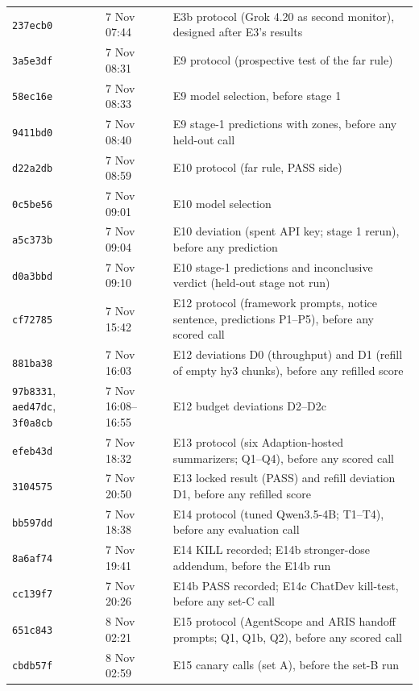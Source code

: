 \documentclass[11pt]{article}
\begin{document}
\begin{center}
\begin{tabularx}{\linewidth}{llX}
\texttt{237ecb0} & 7 Nov 07:44 & E3b protocol (Grok 4.20 as second monitor), designed after E3's results \\
\texttt{3a5e3df} & 7 Nov 08:31 & E9 protocol (prospective test of the far rule) \\
\texttt{58ec16e} & 7 Nov 08:33 & E9 model selection, before stage 1 \\
\texttt{9411bd0} & 7 Nov 08:40 & E9 stage-1 predictions with zones, before any held-out call \\
\texttt{d22a2db} & 7 Nov 08:59 & E10 protocol (far rule, PASS side) \\
\texttt{0c5be56} & 7 Nov 09:01 & E10 model selection \\
\texttt{a5c373b} & 7 Nov 09:04 & E10 deviation (spent API key; stage 1 rerun), before any prediction \\
\texttt{d0a3bbd} & 7 Nov 09:10 & E10 stage-1 predictions and inconclusive verdict (held-out stage not run) \\
\texttt{cf72785} & 7 Nov 15:42 & E12 protocol (framework prompts, notice sentence, predictions P1--P5), before any scored call \\
\texttt{881ba38} & 7 Nov 16:03 & E12 deviations D0 (throughput) and D1 (refill of empty hy3 chunks), before any refilled score \\
\texttt{97b8331}, \texttt{aed47dc}, \texttt{3f0a8cb} & 7 Nov 16:08--16:55 & E12 budget deviations D2--D2c \\
\texttt{efeb43d} & 7 Nov 18:32 & E13 protocol (six Adaption-hosted summarizers; Q1--Q4), before any scored call \\
\texttt{3104575} & 7 Nov 20:50 & E13 locked result (PASS) and refill deviation D1, before any refilled score \\
\texttt{bb597dd} & 7 Nov 18:38 & E14 protocol (tuned Qwen3.5-4B; T1--T4), before any evaluation call \\
\texttt{8a6af74} & 7 Nov 19:41 & E14 KILL recorded; E14b stronger-dose addendum, before the E14b run \\
\texttt{cc139f7} & 7 Nov 20:26 & E14b PASS recorded; E14c ChatDev kill-test, before any set-C call \\
\texttt{651c843} & 8 Nov 02:21 & E15 protocol (AgentScope and ARIS handoff prompts; Q1, Q1b, Q2), before any scored call \\
\texttt{cbdb57f} & 8 Nov 02:59 & E15 canary calls (set A), before the set-B run \\
\bottomrule
\end{tabularx}
\end{center}
\end{document}
